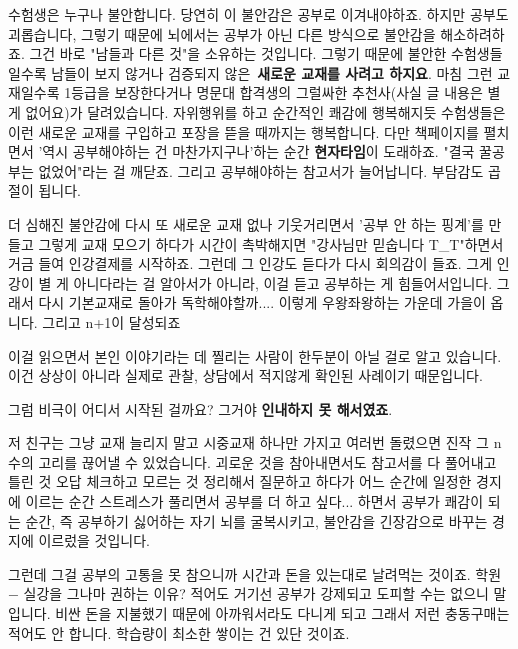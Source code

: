수험생은 누구나 불안합니다. 당연히 이 불안감은 공부로 이겨내야하죠.
하지만 공부도 괴롭습니다, 그렇기 때문에 뇌에서는 공부가 아닌 다른 방식으로 불안감을 해소하려하죠.
그건 바로 "남들과 다른 것"을 소유하는 것입니다.
그렇기 때문에 불안한 수험생들일수록 남들이 보지 않거나 검증되지 않은 \textbf{새로운 교재를 사려고 하지요}.
마침 그런 교재일수록 1등급을 보장한다거나 명문대 합격생의 그럴싸한 추천사(사실 글 내용은 별 게 없어요)가 달려있습니다.
자위행위를 하고 순간적인 쾌감에 행복해지듯 수험생들은 이런 새로운 교재를 구입하고 포장을 뜯을 때까지는 행복합니다.
다만 책페이지를 펼치면서 '역시 공부해야하는 건 마찬가지구나'하는 순간 \textbf{현자타임}이 도래하죠.
"결국 꿀공부는 없었어"라는 걸 깨닫죠. 그리고 공부해야하는 참고서가 늘어납니다. 부담감도 곱절이 됩니다.
\vspace{5mm}

더 심해진 불안감에 다시 또 새로운 교재 없나 기웃거리면서 '공부 안 하는 핑계'를 만들고
그렇게 교재 모으기 하다가 시간이 촉박해지면 "강사님만 믿숩니다 T_T"하면서 거금 들여 인강결제를 시작하죠.
그런데 그 인강도 듣다가 다시 회의감이 들죠. 그게 인강이 별 게 아니다라는 걸 알아서가 아니라, 이걸 듣고 공부하는 게 힘들어서입니다.
그래서 다시 기본교재로 돌아가 독학해야할까.... 이렇게 우왕좌왕하는 가운데 가을이 옵니다. 그리고 n+1이 달성되죠
\vspace{5mm}

이걸 읽으면서 본인 이야기라는 데 찔리는 사람이 한두분이 아닐 걸로 알고 있습니다.
이건 상상이 아니라 실제로 관찰, 상담에서 적지않게 확인된 사례이기 때문입니다.
\vspace{5mm}

그럼 비극이 어디서 시작된 걸까요?
그거야 \textbf{인내하지 못 해서였죠}.
\vspace{5mm}

저 친구는 그냥 교재 늘리지 말고 시중교재 하나만 가지고 여러번 돌렸으면 진작 그 n수의 고리를 끊어낼 수 있었습니다.
괴로운 것을 참아내면서도 참고서를 다 풀어내고 틀린 것 오답 체크하고 모르는 것 정리해서 질문하고 하다가
어느 순간에 일정한 경지에 이르는 순간 스트레스가 풀리면서 공부를 더 하고 싶다... 하면서 공부가 쾌감이 되는 순간,
즉 공부하기 싫어하는 자기 뇌를 굴복시키고, 불안감을 긴장감으로 바꾸는 경지에 이르렀을 것입니다.
\vspace{5mm}

그런데 그걸 공부의 고통을 못 참으니까 시간과 돈을 있는대로 날려먹는 것이죠.
학원 $-$ 실강을 그나마 권하는 이유? 적어도 거기선 공부가 강제되고 도피할 수는 없으니 말입니다.
비싼 돈을 지불했기 때문에 아까워서라도 다니게 되고 그래서 저런 충동구매는 적어도 안 합니다. 학습량이 최소한 쌓이는 건 있단 것이죠.
\vspace{5mm}

